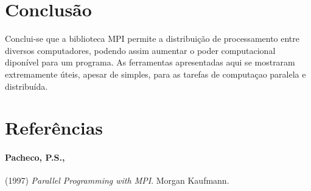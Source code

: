 \documentclass[11pt,a4paper,onecolumn]{article}
\begin{document}
\subsection{}
\subsection{}
\subsection{}

\section{Conclusão}
Conclui-se que a biblioteca MPI permite a distribuição de processamento entre diversos computadores, podendo assim aumentar o poder computacional diponível para um programa.
As ferramentas apresentadas aqui se mostraram extremamente úteis, apesar de simples, para as tarefas de computaçao paralela e distribuída.

\section{Referências}
\paragraph{Pacheco, P.S.,} (1997) \textit{Parallel Programming with MPI}. Morgan Kaufmann.
\end{document}
